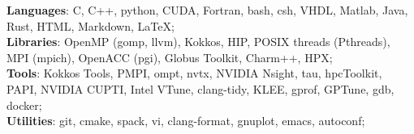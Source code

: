 {{\bf Languages}: C, C++, python, CUDA, Fortran, bash, csh, VHDL, Matlab, Java, Rust, HTML, Markdown, LaTeX};\\
{{\bf Libraries}:  OpenMP (gomp, llvm), Kokkos, HIP, POSIX threads (Pthreads), MPI (mpich), OpenACC (pgi), Globus Toolkit, Charm++, HPX}; \\
{{\bf Tools}: Kokkos Tools, PMPI, ompt, nvtx, NVIDIA Nsight, tau, hpcToolkit,  PAPI, NVIDIA CUPTI, Intel VTune, clang-tidy, KLEE,  gprof, GPTune, gdb, docker}; \\
{{\bf Utilities}: git, cmake, spack, vi, clang-format, gnuplot, emacs, autoconf};\\